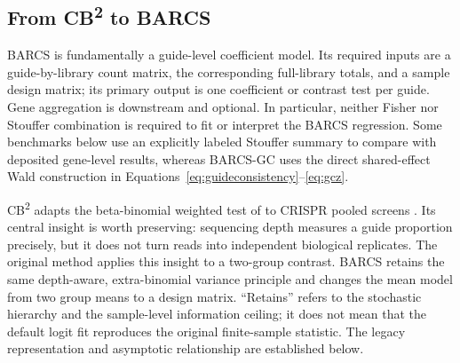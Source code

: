 \subsection{\texorpdfstring{From CB\textsuperscript{2} to
BARCS}{From CB2 to BARCS}}

BARCS is fundamentally a guide-level coefficient model.  Its required inputs
are a guide-by-library count matrix, the corresponding full-library totals,
and a sample design matrix; its primary output is one coefficient or contrast
test per guide.  Gene aggregation is downstream and optional.  In particular,
neither Fisher nor Stouffer combination is required to fit or interpret the
BARCS regression.  Some benchmarks below use an explicitly labeled Stouffer
summary to compare with deposited gene-level results, whereas BARCS-GC uses
the direct shared-effect Wald construction in
Equations~\eqref{eq:guideconsistency}--\eqref{eq:gcz}.

CB\textsuperscript{2} adapts the beta-binomial weighted test of
\citet{baggerly2003differential} to CRISPR pooled screens
\citep{jeong2019beta}.  Its central insight is worth preserving: sequencing
depth measures a guide proportion precisely, but it does not turn reads into
independent biological replicates.  The original method applies this insight
to a two-group contrast.  BARCS retains the same
depth-aware, extra-binomial variance principle and changes the mean model from
two group means to a design matrix.  ``Retains'' refers to the stochastic
hierarchy and the sample-level information ceiling; it does not mean that the
default logit fit reproduces the original finite-sample statistic.  The
legacy representation and asymptotic relationship are established below.

